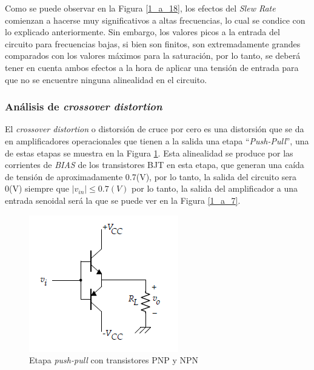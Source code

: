 Como se puede observar en la Figura \ref{1_a_18}, los efectos del
\emph{Slew Rate }comienzan a hacerse muy significativos a altas frecuencias,
lo cual se condice con lo explicado anteriormente. Sin embargo, los
valores picos a la entrada del circuito para frecuencias bajas, si
bien son finitos, son extremadamente grandes comparados con los valores
máximos para la saturación, por lo tanto, se deberá tener en cuenta
ambos efectos a la hora de aplicar una tensión de entrada para que
no se encuentre ninguna alinealidad en el circuito. 

\subsubsection{Análisis de \emph{crossover distortion}}

El \emph{crossover distortion} o distorsión de cruce por cero es una
distorsión que se da en amplificadores operacionales que tienen a
la salida una etapa ``\emph{Push-Pull}'', una de estas etapas se
muestra en la Figura \ref{1_a_6}. Esta alinealidad se produce por
las corrientes de \emph{BIAS} de los transistores BJT en esta etapa,
que generan una caída de tensión de aproximadamente 0.7(V), por lo
tanto, la salida del circuito sera 0(V) siempre que $\left|v_{in}\right|\leq0.7(V)$
por lo tanto, la salida del amplificador a una entrada senoidal será
la que se puede ver en la Figura \ref{1_a_7}.

\begin{figure}[H]
\begin{centering}
\includegraphics[scale=0.5]{../Ex1/iA/Resources1a/push-pull}
\par\end{centering}
\caption{Etapa \emph{push-pull} con transistores PNP y NPN}
\label{1_a_6}
\end{figure}

